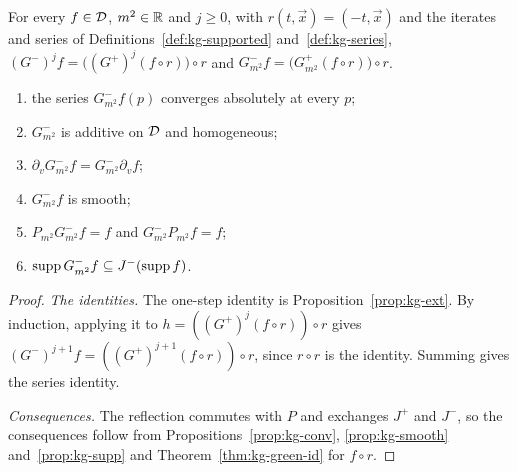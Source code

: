 \begin{proposition}\label{prop:kg-adv}
For every $f\in\mathcal D$, $m^2\in\mathbb R$ and $j\ge0$, with $r(t,\vec x)=(-t,\vec x)$ and the iterates and series
of Definitions~\ref{def:kg-supported} and~\ref{def:kg-series},
$(G^-)^jf=\bigl((G^+)^j(f\circ r)\bigr)\circ r$ and $G^-_{m^2}f=\bigl(G^+_{m^2}(f\circ r)\bigr)\circ r$.
\begin{enumerate}[label=(\alph*),leftmargin=2.5em]
\item the series $G^-_{m^2}f(p)$ converges absolutely at every $p$;
\item $G^-_{m^2}$ is additive on $\mathcal D$ and homogeneous;
\item $\partial_vG^-_{m^2}f=G^-_{m^2}\partial_vf$;
\item $G^-_{m^2}f$ is smooth;
\item $P_{m^2}G^-_{m^2}f=f$ and $G^-_{m^2}P_{m^2}f=f$;
\item $\operatorname{supp} G^-_{m^2}f\subseteq J^-(\operatorname{supp} f)$.
\end{enumerate}
\end{proposition}
\begin{proof}
\emph{The identities.} The one-step identity is Proposition~\ref{prop:kg-ext}. By induction, applying
it to $h=((G^+)^j(f\circ r))\circ r$ gives $(G^-)^{j+1}f=((G^+)^{j+1}(f\circ r))\circ r$, since
$r\circ r$ is the identity. Summing gives the series identity.

\emph{Consequences.} The reflection commutes with $P$ and exchanges $J^+$ and $J^-$, so the
consequences follow from Propositions~\ref{prop:kg-conv}, \ref{prop:kg-smooth} and~\ref{prop:kg-supp}
and Theorem~\ref{thm:kg-green-id} for $f\circ r$.
\end{proof}

